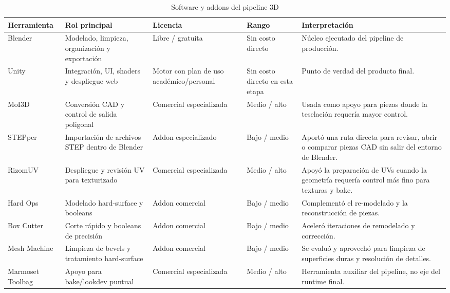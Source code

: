 \begin{table}[htbp]
    \caption{Software y addons del pipeline 3D}
    \label{tab:software_pipeline_3d}
    \centering
    \scriptsize
    \setlength{\tabcolsep}{2pt}
    \begin{tabular}{p{2.0cm}p{2.55cm}p{2.0cm}p{1.65cm}p{3.15cm}}
    \hline
    \textbf{Herramienta} & \textbf{Rol principal} & \textbf{Licencia} & \textbf{Rango} & \textbf{Interpretación} \\ \hline
    Blender & Modelado, limpieza, organización y exportación & Libre / gratuita & Sin costo directo & Núcleo ejecutado del pipeline de producción. \\
    Unity & Integración, UI, shaders y despliegue web & Motor con plan de uso académico/personal & Sin costo directo en esta etapa & Punto de verdad del producto final. \\
    MoI3D & Conversión CAD y control de salida poligonal & Comercial especializada & Medio / alto & Usada como apoyo para piezas donde la teselación requería mayor control. \\
    STEPper & Importación de archivos STEP dentro de Blender & Addon especializado & Bajo / medio & Aportó una ruta directa para revisar, abrir o comparar piezas CAD sin salir del entorno de Blender. \\
    RizomUV & Despliegue y revisión UV para texturizado & Comercial especializada & Medio / alto & Apoyó la preparación de UVs cuando la geometría requería control más fino para texturas y bake. \\
    Hard Ops & Modelado hard-surface y booleans & Addon comercial & Bajo / medio & Complementó el re-modelado y la reconstrucción de piezas. \\
    Box Cutter & Corte rápido y booleans de precisión & Addon comercial & Bajo / medio & Aceleró iteraciones de remodelado y corrección. \\
    Mesh Machine & Limpieza de bevels y tratamiento hard-surface & Addon comercial & Bajo / medio & Se evaluó y aprovechó para limpieza de superficies duras y resolución de detalles. \\
    Marmoset Toolbag & Apoyo para bake/lookdev puntual & Comercial especializada & Medio / alto & Herramienta auxiliar del pipeline, no eje del runtime final. \\
    \hline
    \end{tabular}
    \par\vspace{0.5\baselineskip}
\end{table}

